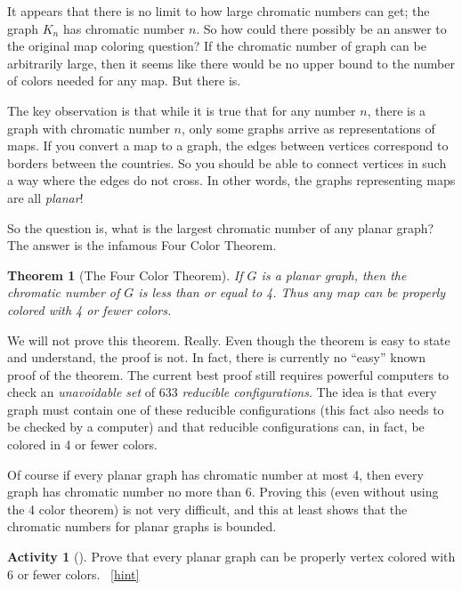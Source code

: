 \documentclass[10pt,]{book}
\theoremstyle{plain}
\newtheorem{theorem}{Theorem}[section]
\theoremstyle{definition}
\theoremstyle{definition}
\theoremstyle{definition}
\newtheorem{activity}[project]{Activity}
\numberwithin{equation}{chapter}
\begin{document}
\hypertarget{p-1596}{}%
It appears that there is no limit to how large chromatic numbers can get; the graph \(K_n\) has chromatic number \(n\). So how could there possibly be an answer to the original map coloring question? If the chromatic number of graph can be arbitrarily large, then it seems like there would be no upper bound to the number of colors needed for any map. But there is.%
\par
\hypertarget{p-1597}{}%
The key observation is that while it is true that for any number \(n\), there is a graph with chromatic number \(n\), only some graphs arrive as representations of maps. If you convert a map to a graph, the edges between vertices correspond to borders between the countries. So you should be able to connect vertices in such a way where the edges do not cross. In other words, the graphs representing maps are all \emph{planar}!%
\par
\hypertarget{p-1598}{}%
So the question is, what is the largest chromatic number of any planar graph? The answer is the infamous Four Color Theorem.%
\begin{theorem}[{The Four Color Theorem}]\label{theorem-14}
\hypertarget{p-1599}{}%
 If \(G\) is a planar graph, then the chromatic number of \(G\) is less than or equal to 4. Thus any map can be properly colored with 4 or fewer colors.%
\end{theorem}
\hypertarget{p-1600}{}%
We will not prove this theorem. Really. Even though the theorem is easy to state and understand, the proof is not. In fact, there is currently no ``easy'' known proof of the theorem. The current best proof still requires powerful computers to check an \emph{unavoidable set} of 633 \emph{reducible configurations}. The idea is that every graph must contain one of these reducible configurations (this fact also needs to be checked by a computer) and that reducible configurations can, in fact, be colored in 4 or fewer colors.%
\par
\hypertarget{p-1601}{}%
Of course if every planar graph has chromatic number at most 4, then every graph has chromatic number no more than 6.  Proving this (even without using the 4 color theorem) is not very difficult, and this at least shows that the chromatic numbers for planar graphs is bounded.%
\begin{activity}[]\label{activity-296}
\hypertarget{p-1602}{}%
Prove that every planar graph can be properly vertex colored with 6 or fewer colors.%
~\hfill{\tiny\hyperlink{a-303}{[hint]}\hypertarget{q-303}{}}\end{activity}
\end{document}
